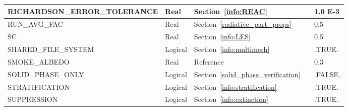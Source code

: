 \documentclass[11pt]{book}
\begin{document}
\begin{longtable}{@{\extracolsep{\fill}}|l|l|l|l|l|}
{\ct RICHARDSON\_ERROR\_TOLERANCE}              & Real          & Section~\ref{info:REAC}                               &               & 1.0 E-3           \\ \hline
{\ct RUN\_AVG\_FAC}                             & Real          & Section~\ref{radiative_part_props}                    &               & 0.5               \\ \hline
{\ct SC}                                        & Real          & Section~\ref{info:LES}                                &               & 0.5               \\ \hline
{\ct SHARED\_FILE\_SYSTEM}                      & Logical       & Section~\ref{info:multimesh}                          &               & {\ct .TRUE.}      \\ \hline
{\ct SMOKE\_ALBEDO}                             & Real          & Reference~\cite{Smokeview_Users_Guide}                &               & 0.3               \\ \hline
{\ct SOLID\_PHASE\_ONLY}                        & Logical       & Section~\ref{solid_phase_verification}                &               & {\ct .FALSE.}     \\ \hline
{\ct STRATIFICATION}                            & Logical       & Section~\ref{info:stratification}                     &               & {\ct .TRUE.}      \\ \hline
{\ct SUPPRESSION}                               & Logical       & Section~\ref{info:extinction}                         &               & {\ct .TRUE.}      \\ \hline

\end{longtable}
\end{document}
